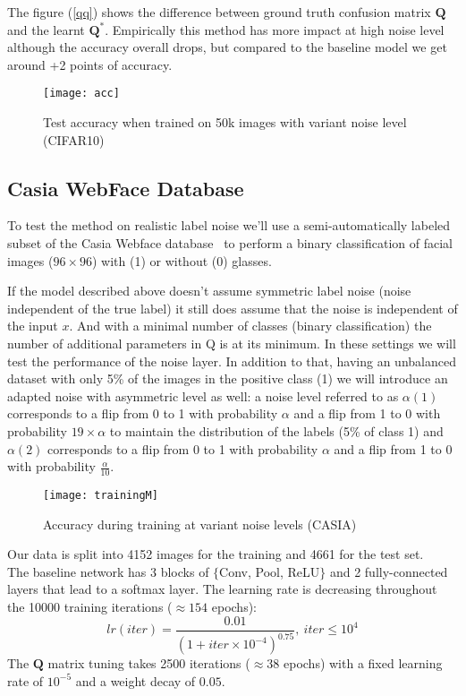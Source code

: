 \documentclass[10pt,twocolumn,letterpaper]{article}
\newcommand{\Q}{\mathbf{Q}}
\begin{document}
The figure (\ref{qq}) shows the difference between ground truth confusion matrix $\Q$ and the learnt $\Q^*$. Empirically this method has more impact at high noise level although the accuracy overall drops, but compared to the baseline model we get around +2 points of accuracy.
\begin{figure}
    \centering
    \texttt{[image: acc]}
    \caption{Test accuracy when trained on 50k images with variant noise level (CIFAR10)}
\end{figure}
\subsection{Casia WebFace Database}
To test the method on realistic label noise we'll use a semi-automatically labeled subset of the Casia Webface database~\cite{yi2014learning} to perform a binary classification of facial images ($96\times 96$) with (1) or without (0) glasses.

If the model described above doesn't assume symmetric label noise (noise independent of the true label) it still does assume that the noise is independent of the input $x$. And with a minimal number of classes (binary classification) the number of additional parameters in Q is at its minimum. In these settings we will test the performance of the noise layer. 
In addition to that, having an unbalanced dataset with only 5\% of the images in the positive class (1) we will introduce an adapted noise with asymmetric level as well: a noise level referred to as $\alpha(1)$ corresponds to a flip from 0 to 1 with probability $\alpha$ and a flip from 1 to 0 with probability $19\times\alpha$ to maintain the distribution of the labels (5\% of class 1) and  $\alpha(2)$ corresponds to a flip from 0 to 1 with probability $\alpha$ and a flip from 1 to 0 with probability $\frac{\alpha}{10}$.
\begin{figure}
    \centering
    \texttt{[image: trainingM]}
    \caption{Accuracy during training at variant noise levels (CASIA)}
\end{figure}

Our data is split into 4152 images for the training and 4661 for the test set.\\ The baseline network has 3 blocks of $\{$Conv, Pool, ReLU$\}$ and 2 fully-connected layers that lead to a softmax layer. The learning rate is decreasing throughout the 10000 training iterations ($\approx 154$ epochs):
\[\mathit{lr}(\mathit{iter})= \frac{0.01}{(1+iter\times 10^{-4} )^{0.75}},\:iter\leq 10^4\]
The $\Q$ matrix tuning takes 2500 iterations ($\approx 38$ epochs) with a fixed learning rate of $10^{-5}$ and a weight decay of $0.05$.
\end{document}
